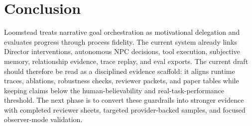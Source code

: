 \section{Conclusion}

Loomstead treats narrative goal orchestration as motivational delegation and evaluates progress through process fidelity. The current system already links Director interventions, autonomous NPC decisions, tool execution, subjective memory, relationship evidence, trace replay, and eval exports. The current draft should therefore be read as a disciplined evidence scaffold: it aligns runtime traces, ablations, robustness checks, reviewer packets, and paper tables while keeping claims below the human-believability and real-task-performance threshold. The next phase is to convert these guardrails into stronger evidence with completed reviewer sheets, targeted provider-backed samples, and focused observer-mode validation.
